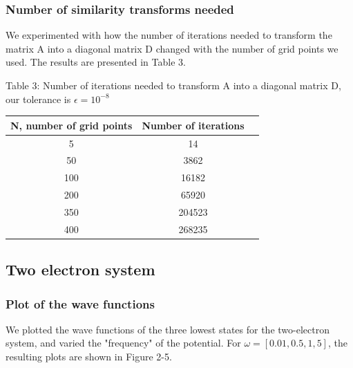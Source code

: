 \documentclass[norsk,a4paper,12pt]{article}
\begin{document}
\subsubsection{Number of similarity transforms needed}
\par
\vspace{2mm}

We experimented with how the number of iterations needed to transform the matrix A into a diagonal matrix D changed with the number of grid points we used. The results are presented in Table 3.
\par
\vspace{3mm}


Table 3: Number of iterations needed to transform A into a diagonal matrix D, our tolerance is $\epsilon = 10^{-8}$
\par
\vspace{3mm}
\begin{tabular}{|c|c|c|}\hline
     {\bf N, number of grid points} & {\bf Number of iterations}\\ \hline
     5 & 14\\
     50 & 3862\\
     100 & 16182\\
     200 & 65920\\
     350 & 204523 \\ 
     400 & 268235\\\hline
\end{tabular}\par
  

\par
\vspace{5mm}

\subsection{Two electron system}
\par
\vspace{3mm}

\subsubsection{Plot of the wave functions}
\par
\vspace{3mm}

We plotted the wave functions of the three lowest states for the two-electron system, and varied the "frequency" of the potential. For $\omega = [0.01, 0.5, 1, 5]$, the resulting plots are shown in Figure 2-5. 
\par
\vspace{3mm}
\end{document}
